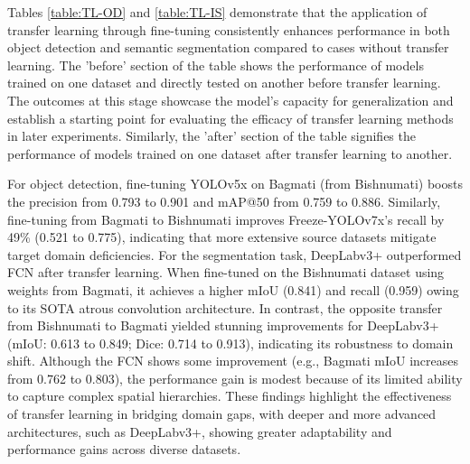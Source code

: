 \documentclass{ieeeaccess}
\begin{document}
Tables \ref{table:TL-OD} and \ref{table:TL-IS} demonstrate that the application of transfer learning through fine-tuning consistently enhances performance in both object detection and semantic segmentation compared to cases without transfer learning. The 'before' section of the table shows the performance of models trained on one dataset and directly tested on another before transfer learning. The outcomes at this stage showcase the model's capacity for generalization and establish a starting point for evaluating the efficacy of transfer learning methods in later experiments. Similarly, the 'after' section of the table signifies the performance of models trained on one dataset after transfer learning to another. 

For object detection, fine-tuning YOLOv5x on Bagmati (from Bishnumati) boosts the precision from 0.793 to 0.901 and mAP@50 from 0.759 to 0.886. Similarly, fine-tuning from Bagmati to Bishnumati improves Freeze-YOLOv7x's recall by 49\% (0.521 to 0.775), indicating that more extensive source datasets mitigate target domain deficiencies. For the segmentation task, DeepLabv3+ outperformed FCN after transfer learning. When fine-tuned on the Bishnumati dataset using weights from Bagmati, it achieves a higher mIoU (0.841) and recall (0.959) owing to its SOTA atrous convolution architecture. In contrast, the opposite transfer from Bishnumati to Bagmati yielded stunning improvements for DeepLabv3+ (mIoU: 0.613 to 0.849; Dice: 0.714 to 0.913), indicating its robustness to domain shift. Although the FCN shows some improvement (e.g., Bagmati mIoU increases from 0.762 to 0.803), the performance gain is modest because of its limited ability to capture complex spatial hierarchies. These findings highlight the effectiveness of transfer learning in bridging domain gaps, with deeper and more advanced architectures, such as DeepLabv3+, showing greater adaptability and performance gains across diverse datasets.
\end{document}
